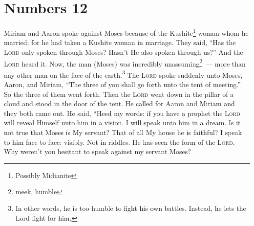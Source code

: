 \section{Numbers 12}\label{Numbers 12}
\begin{enumerate}[align=center]
     Miriam and Aaron spoke against Moses because of the Kushite\footnote{Possibly Midianite} woman whom he married; for he had taken a Kushite woman in marriage.%
     They said, ``Has the \textsc{Lord} only spoken through Moses? Hasn't He also spoken through us?'' And the \textsc{Lord} heard it.%
     Now, the man (Moses) was incredibly unassuming\footnote{meek, humble}~--- more than any other man on the face of the earth.\footnote{In other words, he is too humble to fight his own battles. Instead, he lets the Lord fight for him.}%
     The \textsc{Lord} spoke suddenly unto Moses, Aaron, and Miriam, ``The three of you shall go forth unto the tent of meeting.'' So the three of them went forth.%
     Then the \textsc{Lord} went down in the pillar of a cloud and stood in the door of the tent. He called for Aaron and Miriam and they both came out.%
     He said, ``Heed my words: if you have a prophet the \textsc{Lord} will reveal Himself unto him in a vision. I will speak unto him in a dream.%
     Is it not true that Moses is My servant? That of all My house he is faithful?%
     I speak to him face to face: visibly. Not in riddles. He has seen the form of the \textsc{Lord}. Why weren't you hesitant to speak against my servant Moses?%
\end{enumerate}
